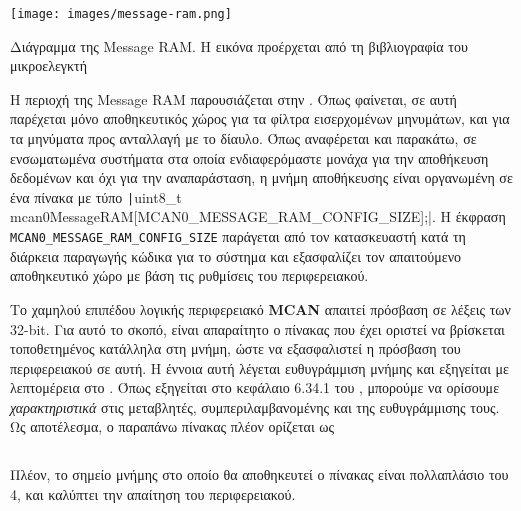 \documentclass[a4paper,nobib,justified]{tufte-book}
\begin{document}
\begin{marginfigure}
	\centering
	\texttt{[image: images/message-ram.png]}
	\label{fig:message-ram}
	\caption[Διάγραμμα της Message RAM]{Διάγραμμα της Message RAM. Η εικόνα προέρχεται από τη βιβλιογραφία του μικροελεγκτή}
\end{marginfigure}

Η περιοχή της Message RAM παρουσιάζεται στην . Όπως φαίνεται, σε αυτή παρέχεται μόνο αποθηκευτικός χώρος για τα φίλτρα εισερχομένων μηνυμάτων, και για τα μηνύματα προς ανταλλαγή με το δίαυλο. Όπως αναφέρεται και παρακάτω, σε ενσωματωμένα συστήματα στα οποία ενδιαφερόμαστε μονάχα για την αποθήκευση δεδομένων και όχι για την αναπαράσταση, η μνήμη αποθήκευσης είναι οργανωμένη σε ένα πίνακα με τύπο \texttt|uint8_t mcan0MessageRAM[MCAN0_MESSAGE_RAM_CONFIG_SIZE];|. Η έκφραση \texttt{MCAN0\_MESSAGE\_RAM\_CONFIG\_SIZE} παράγεται από τον κατασκευαστή κατά τη διάρκεια παραγωγής κώδικα για το σύστημα και εξασφαλίζει τον απαιτούμενο αποθηκευτικό χώρο με βάση τις ρυθμίσεις του περιφερειακού.

Το χαμηλού επιπέδου λογικής περιφερειακό \textbf{MCAN} απαιτεί πρόσβαση σε λέξεις των 32-bit. Για αυτό το σκοπό, είναι απαραίτητο ο πίνακας που έχει οριστεί να βρίσκεται τοποθετημένος κατάλληλα στη μνήμη, ώστε να εξασφαλιστεί η πρόσβαση του περιφερειακού σε αυτή. Η έννοια αυτή λέγεται ευθυγράμμιση μνήμης και εξηγείται με λεπτομέρεια στο . Όπως εξηγείται στο κεφάλαιο 6.34.1 του , μπορούμε να ορίσουμε \emph{χαρακτηριστικά} στις μεταβλητές, συμπεριλαμβανομένης και της ευθυγράμμισης τους. Ως αποτέλεσμα, ο παραπάνω πίνακας πλέον ορίζεται ως \inputminted{c++}{code/examples/message-ram/alignment.cpp} Πλέον, το σημείο μνήμης στο οποίο θα αποθηκευτεί ο πίνακας είναι πολλαπλάσιο του 4, και καλύπτει την απαίτηση του περιφερειακού.


\end{document}
